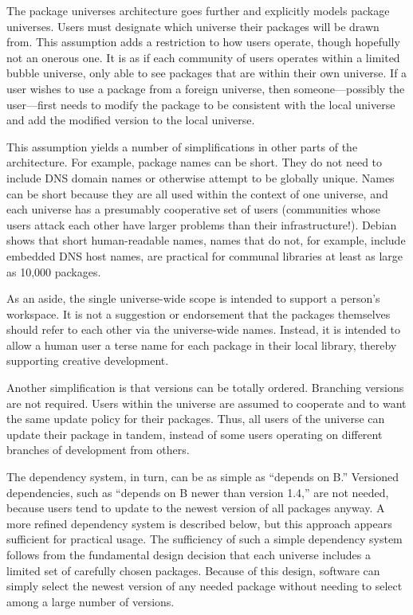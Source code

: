 \documentclass{article}
\begin{document}
The package universes architecture goes further and explicitly models
package universes.  Users must designate which universe their packages
will be drawn from.  This assumption adds a restriction to how users
operate, though hopefully not an onerous one.  It is as if each
community of users operates within a limited bubble universe, only
able to see packages that are within their own universe.  If a user
wishes to use a package from a foreign universe, then
someone---possibly the user---first needs to modify the package to be
consistent with the local universe and add the modified version to the
local universe.

This assumption yields a number of simplifications in other parts of
the architecture.  For example, package names can be short.  They do
not need to include DNS domain names or otherwise attempt to be
globally unique.
Names can be short because they are all used within the
context of one universe, and each universe has a presumably
cooperative set of users (communities whose users attack each other
have larger problems than their infrastructure!).  Debian
\cite{monga04:debian,debian:web}
shows that short human-readable names, names that do not, for example,
include embedded DNS host names, are practical for communal libraries
at least as large as 10,000 packages.

As an aside, the single universe-wide scope is intended to support a
person's workspace.  It is not a suggestion or endorsement that the
packages themselves should refer to each other via the universe-wide
names.  Instead, it is intended to allow a human user a terse name for
each package in their local library, thereby supporting creative
development.


Another simplification is that versions can be totally ordered.
Branching versions are not required.  Users within the universe are
assumed to cooperate and to want the same update policy for their
packages.  Thus, all users of the universe can update their package in
tandem, instead of some users operating on different branches of
development from others.

The dependency system, in turn, can be as simple as ``depends on B.''
Versioned dependencies, such as ``depends on B newer than version
1.4,'' are not needed, because users tend to update to the newest
version of all packages anyway.  A more refined dependency system is
described below, but this approach appears sufficient for practical
usage.  The sufficiency of such a simple dependency system follows
from the fundamental design decision that each universe includes a
limited set of carefully chosen packages.  Because of this design,
software can simply select the newest version of any needed package
without needing to select among a large number of versions.
\end{document}
